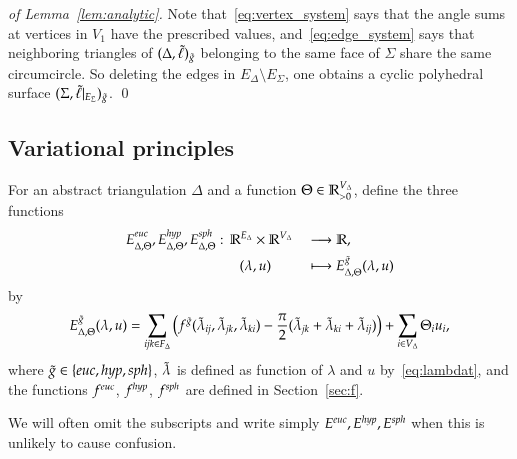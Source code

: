 \documentclass[Thesis]{subfiles}
\begin{document}
\begin{proof}[of Lemma~\ref{lem:analytic}]
  Note that~\eqref{eq:vertex_system} says that the angle sums at
  vertices in $V_{1}$ have the prescribed values,
  and~\eqref{eq:edge_system} says that neighboring triangles of
  $(\Delta,\tilde{\ell})_{\tilde{g}}$ belonging to the same face of $\Sigma$ share
  the same circumcircle. So deleting the edges in $E_{\Delta}\setminus
  E_{\Sigma}$, one obtains a cyclic polyhedral surface
  $(\Sigma,\tilde{\ell}|_{E_{\Sigma}})_{\tilde{g}}$.
  \qed
\end{proof}

\subsection{Variational principles}
\label{sec:variational}

\begin{definition}
  \label{def:E}
  For an abstract triangulation $\Delta$ and a function
  $\Theta\in\mathbb R_{>0}^{V_{\Delta}}$, define the three functions
  \begin{alignat*}{2}
      E_{\Delta,\Theta}^{\euc},E_{\Delta,\Theta}^{\hyp},E_{\Delta,\Theta}^{\sph}:\,
      \R^{E_{\Delta}}&\times\R^{V_{\Delta}}&&\longrightarrow\R,\\
      (\lambda&, u)&&\longmapsto E_{\Delta,\Theta}^{\gt}(\lambda, u)
  \end{alignat*}
  by
  \begin{equation}
      \label{eq:E}
      E_{\Delta,\Theta}^{\tilde{g}}(\lambda, u) 
      = \sum_{{\it ijk}\in F_{\Delta}}\big(f^{\tilde{g}}(\tilde{\lambda}_{\it ij},\tilde{\lambda}_{\it jk},\tilde{\lambda}_{\it ki}) -
      \frac{\pi}{2}(\tilde{\lambda}_{\it jk} + \tilde{\lambda}_{\it ki} +
      \tilde{\lambda}_{\it ij})\big) + \sum_{i\in V_{\Delta}} \Theta_i u_i,    
  \end{equation}
  where $\gt\in\{\euc,\hyp,\sph\}$, $\tilde{\lambda}$ is defined as function
  of $\lambda$ and $u$ by~\eqref{eq:lambdat}, and the functions
  $f^{\euc}$, $f^{\mathit{hyp}}$, $f^{\mathit{sph}}$ are defined in Section~\ref{sec:f}.
\end{definition}

We will often omit the subscripts and write simply
$E^{\euc},E^{\hyp},E^{\sph}$ when this is unlikely to cause confusion.
\end{document}
